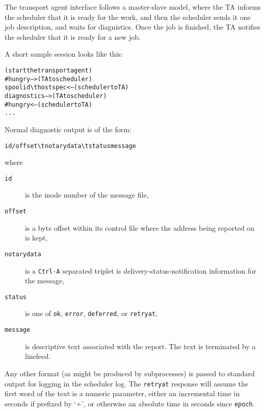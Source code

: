 The transport agent interface follows a master-slave model,
where  the  TA  informs the scheduler that it is ready for
the work, and then the scheduler sends it one job 
description,  and  waits  for diagnistics.  Once the job is 
finished, the TA notifies the scheduler that it is ready for
a new job.

A short sample session looks like this:
\begin{alltt}
{\rm{}(start the transport agent)}
#hungry             {\rm{--> (TA to scheduler)}}
spoolid \verb/\t/ hostspec {\rm{<-- (scheduler to TA)}}
diagnostics         {\rm{--> (TA to scheduler)}}
#hungry             {\rm{<-- (scheduler to TA)}}
...
\end{alltt}

Normal diagnostic output is of the form:
\begin{alltt}
id / offset \verb/\t/ notarydata \verb/\t/ status message
\end{alltt}

where
\begin{description}
\item[{\tt id}] \mbox{}

is the inode number of the message file,

\item[{\tt offset}] \mbox{}

is a byte offset within its control file where the address
being  reported on  is kept,

\item[{\tt notarydata}] \mbox{}

is a {\tt Ctrl-A} separated triplet is delivery-status-notification
information for  the message, 

\item[{\tt status}] \mbox{}

is one of {\tt ok}, {\tt error}, {\tt deferred}, or {\tt retryat},

\item[{\tt message}] \mbox{}

is  descriptive  text  associated
with  the  report.   The text is terminated by a linefeed.

\end{description}


Any other format (as might be produced by subprocesses) is
passed  to  standard  output  for logging in the scheduler
log. The {\tt retryat} response will assume the first word  of
the text is a numeric parameter, either an incremental
time in seconds if prefixed by `+', or otherwise an absolute
time in seconds since {\tt epoch}.

